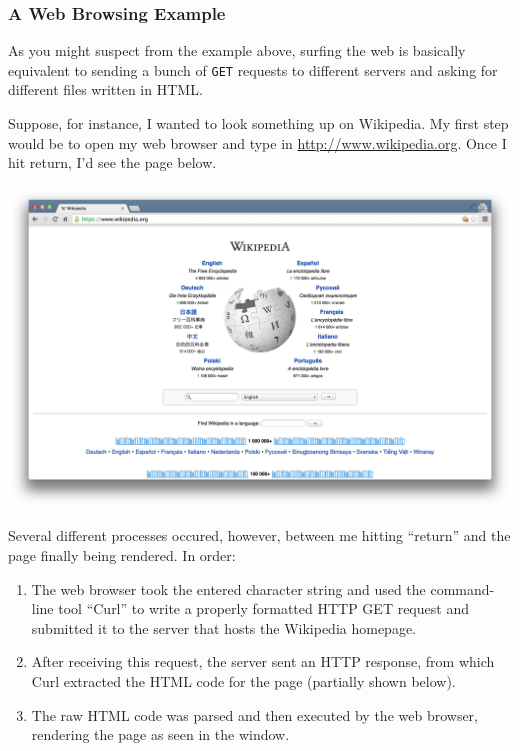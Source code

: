\documentclass[]{book}
\begin{document}
\hypertarget{a-web-browsing-example}{%
\subsubsection*{A Web Browsing Example}\label{a-web-browsing-example}}

As you might suspect from the example above, surfing the web is basically equivalent to sending a bunch of \texttt{GET} requests to different servers and asking for different files written in HTML.

Suppose, for instance, I wanted to look something up on Wikipedia. My first step would be to open my web browser and type in \url{http://www.wikipedia.org}. Once I hit return, I'd see the page below.

\begin{center}\includegraphics[width=0.7\linewidth]{img/wikipedia} \end{center}

Several different processes occured, however, between me hitting ``return'' and the page finally being rendered. In order:

\begin{enumerate}
\def\labelenumi{\arabic{enumi}.}
\item
  The web browser took the entered character string and used the command-line tool ``Curl'' to write a properly formatted HTTP GET request and submitted it to the server that hosts the Wikipedia homepage.
\item
  After receiving this request, the server sent an HTTP response, from which Curl extracted the HTML code for the page (partially shown below).
\item
  The raw HTML code was parsed and then executed by the web browser, rendering the page as seen in the window.
\end{enumerate}
\end{document}
